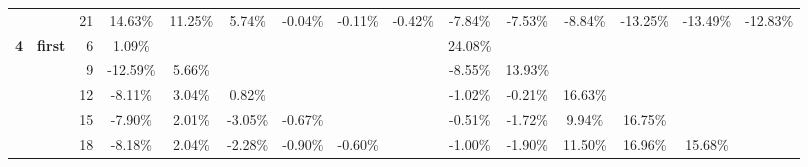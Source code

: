 \begin{table}[t]
{\begin{tabular}{ccrcccccccccccc}
          & \textcolor[rgb]{ .502,  .502,  .502}{} & 21    & \cellcolor[rgb]{ .827,  .875,  .945}14.63\% & \cellcolor[rgb]{ .867,  .902,  .957}11.25\% & \cellcolor[rgb]{ .925,  .945,  .98}5.74\% & \cellcolor[rgb]{ .984,  .984,  .996}-0.04\% & \cellcolor[rgb]{ .984,  .984,  .996}-0.11\% & \cellcolor[rgb]{ .984,  .976,  .988}-0.42\% & \cellcolor[rgb]{ .98,  .824,  .831}-7.84\% & \cellcolor[rgb]{ .98,  .827,  .839}-7.53\% & \cellcolor[rgb]{ .98,  .8,  .812}-8.84\% & \cellcolor[rgb]{ .98,  .706,  .718}-13.25\% & \cellcolor[rgb]{ .98,  .702,  .714}-13.49\% & \cellcolor[rgb]{ .98,  .718,  .725}-12.83\% \\
    \cmidrule(r){1-3}
    \textbf{4} & \multicolumn{1}{l}{\textcolor[rgb]{ .502,  .502,  .502}{\textbf{first}}} & 6     & \cellcolor[rgb]{ .976,  .98,  .996}1.09\% &       &       &       &       &       & \cellcolor[rgb]{ .722,  .8,  .906}24.08\% &       &       &       &       &  \\
          & \textcolor[rgb]{ .502,  .502,  .502}{} & 9     & \cellcolor[rgb]{ .98,  .722,  .733}-12.59\% & \cellcolor[rgb]{ .925,  .945,  .98}5.66\% &       &       &       &       & \cellcolor[rgb]{ .98,  .808,  .816}-8.55\% & \cellcolor[rgb]{ .835,  .882,  .949}13.93\% &       &       &       &  \\
          & \textcolor[rgb]{ .502,  .502,  .502}{} & 12    & \cellcolor[rgb]{ .98,  .816,  .827}-8.11\% & \cellcolor[rgb]{ .957,  .965,  .988}3.04\% & \cellcolor[rgb]{ .98,  .984,  1}0.82\% &       &       &       & \cellcolor[rgb]{ .984,  .965,  .976}-1.02\% & \cellcolor[rgb]{ .984,  .98,  .992}-0.21\% & \cellcolor[rgb]{ .804,  .859,  .937}16.63\% &       &       &  \\
          & \textcolor[rgb]{ .502,  .502,  .502}{} & 15    & \cellcolor[rgb]{ .98,  .82,  .831}-7.90\% & \cellcolor[rgb]{ .969,  .973,  .992}2.01\% & \cellcolor[rgb]{ .984,  .922,  .933}-3.05\% & \cellcolor[rgb]{ .984,  .973,  .984}-0.67\% &       &       & \cellcolor[rgb]{ .984,  .976,  .988}-0.51\% & \cellcolor[rgb]{ .984,  .949,  .961}-1.72\% & \cellcolor[rgb]{ .878,  .914,  .965}9.94\% & \cellcolor[rgb]{ .804,  .859,  .937}16.75\% &       &  \\
          & \textcolor[rgb]{ .502,  .502,  .502}{} & 18    & \cellcolor[rgb]{ .98,  .816,  .824}-8.18\% & \cellcolor[rgb]{ .969,  .973,  .992}2.04\% & \cellcolor[rgb]{ .984,  .937,  .949}-2.28\% & \cellcolor[rgb]{ .984,  .969,  .98}-0.90\% & \cellcolor[rgb]{ .984,  .973,  .984}-0.60\% &       & \cellcolor[rgb]{ .984,  .965,  .976}-1.00\% & \cellcolor[rgb]{ .984,  .945,  .957}-1.90\% & \cellcolor[rgb]{ .863,  .902,  .957}11.50\% & \cellcolor[rgb]{ .8,  .859,  .937}16.96\% & \cellcolor[rgb]{ .816,  .867,  .941}15.68\% &  \\

\end{tabular}}
\end{table}
